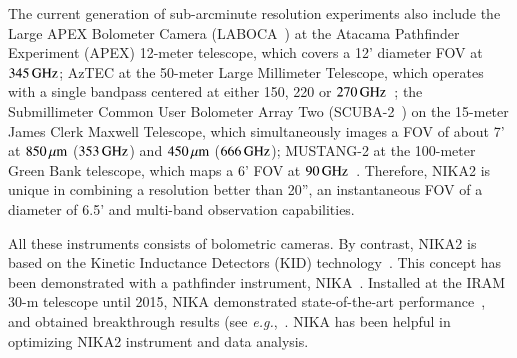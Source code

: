 
The current generation of sub-arcminute resolution experiments also
include the Large APEX Bolometer Camera
(LABOCA~\citep{Siringo2009_LABOCA}) at the Atacama
Pathfinder Experiment (APEX) 12-meter telescope, which covers a
12' diameter FOV at $345\, \rm{GHz}$; AzTEC at the
50-meter Large Millimeter Telescope, which operates with a
single bandpass centered at either 150, 220 or
$270\,\rm{GHz}$~\citep{Wilson2008_AZTEC}; the Submillimeter Common User Bolometer
Array Two (SCUBA-2~\citep{Holland2013_SCUBA2,Dempsey2013_SCUBA2}) on the
15-meter James Clerk Maxwell Telescope, which simultaneously
images a FOV of about 7' at $850\, \mu\rm{m}$ ($353\,
\rm{GHz}$) and $450\, \mu\rm{m}$
($666\,\rm{GHz}$); MUSTANG-2 at the 100-meter Green Bank telescope,
which maps a 6' FOV at
$90\,\rm{GHz}$~\citep{Dicker2014_MUSTANG2, Stanchfield2016_MUSTANG2}.
Therefore, NIKA2 is unique
in combining a resolution better than 20'', an instantaneous FOV of a
diameter of 6.5' and multi-band observation capabilities. 

All these instruments consists of bolometric cameras. By contrast,
NIKA2 is based on the Kinetic Inductance Detectors (KID)
technology~\citep{Day2003, Doyle2008_LEKID, Shu2018_LEKID}. This concept has been
demonstrated with a pathfinder instrument,
NIKA~\citep{Monfardini2011_NIKA}.
Installed at the IRAM 30-m telescope until 2015, NIKA demonstrated
state-of-the-art performance~\citep{Catalano2014}, and obtained
breakthrough results
(see \emph{e.g.},~\citet{Adam2014, Adam2017_kSZ}.
NIKA has been helpful in optimizing NIKA2 instrument and data
analysis. 

%


